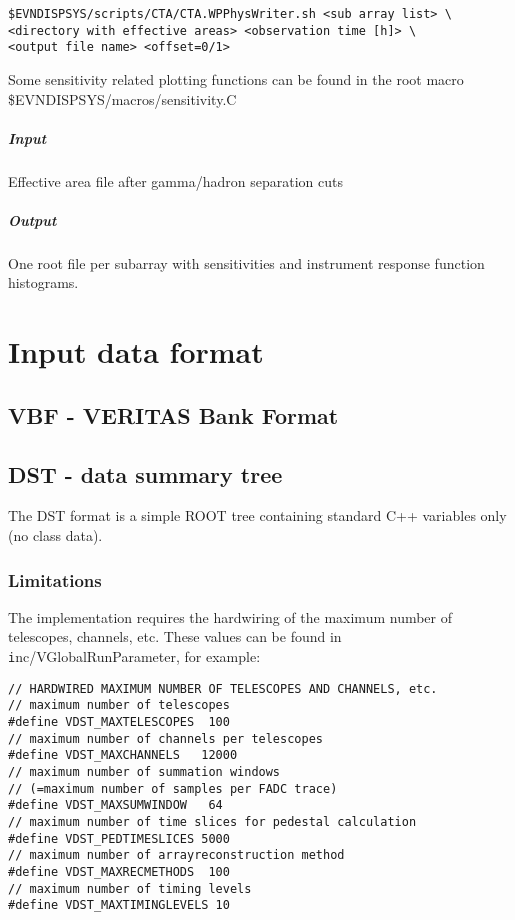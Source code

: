 \documentclass[titlepage,a4paper,twoside,11pt]{report}
\begin{document}
\begin{lstlisting}
$EVNDISPSYS/scripts/CTA/CTA.WPPhysWriter.sh <sub array list> \
<directory with effective areas> <observation time [h]> \
<output file name> <offset=0/1>
\end{lstlisting}

Some sensitivity related plotting functions can be found in the
root macro \$EVNDISPSYS/macros/sensitivity.C

\paragraph{Input}
Effective area file after gamma/hadron separation cuts

\paragraph{Output}
One root file per subarray with sensitivities and instrument response function histograms.

\chapter{Input data format}

\section{VBF - VERITAS Bank Format}

\section{DST - data summary tree}
\label{SECTION.DST}

The DST format is a simple ROOT tree containing standard C++ variables only (no class data).

\subsection{Limitations}
\label{SUBSECTION.DST.LIMITATIONS}

The implementation requires the hardwiring of the maximum number of telescopes, channels, etc. 
These values can be found in {\texttt inc/VGlobalRunParameter}, for example:

\begin{lstlisting}
// HARDWIRED MAXIMUM NUMBER OF TELESCOPES AND CHANNELS, etc.
// maximum number of telescopes
#define VDST_MAXTELESCOPES  100
// maximum number of channels per telescopes
#define VDST_MAXCHANNELS   12000
// maximum number of summation windows
// (=maximum number of samples per FADC trace)   
#define VDST_MAXSUMWINDOW   64
// maximum number of time slices for pedestal calculation
#define VDST_PEDTIMESLICES 5000   
// maximum number of arrayreconstruction method 
#define VDST_MAXRECMETHODS  100
// maximum number of timing levels
#define VDST_MAXTIMINGLEVELS 10    
\end{lstlisting}
\end{document}
